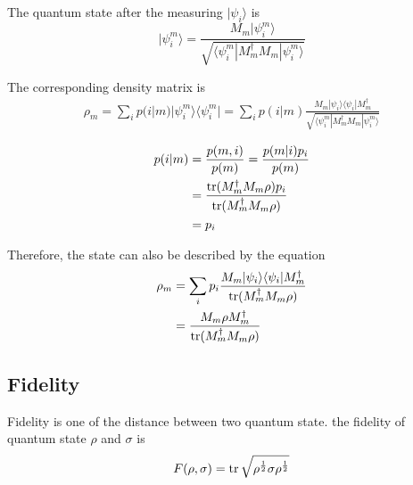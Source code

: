 The quantum state after the measuring $|\psi_i\rangle$ is 
\begin{equation}
  |\psi^m_i\rangle = \frac{M_m|\psi^m_i\rangle}{\sqrt{\langle \psi^m_i|M^{\dagger}_m M_m|\psi^m_i\rangle}}
\end{equation}

The corresponding density matrix is
\begin{equation}
  \begin{split}
    \rho_m = \sum_i p(i|m)|\psi^m_i\rangle\langle\psi^m_i| = \sum_i p(i|m)\frac{M_m|\psi_i\rangle\langle\psi_i|M^{\dagger}_m}{\sqrt{\langle \psi^m_i|M^{\dagger}_m M_m|\psi^m_i\rangle}}
  \end{split}
\end{equation}

\begin{equation}
  \begin{split}
    p(i|m) &= \frac{p(m, i)}{p(m)} = \frac{p(m|i)p_i}{p(m)} \\
    &= \frac{\operatorname{tr}(M^{\dagger}_m M_m \rho) p_i}{\operatorname{tr}(M^{\dagger}_m M_m \rho)} \\
    &= p_i
  \end{split}
\end{equation}

Therefore, the state can also be described by the equation
\begin{equation}
  \begin{split}
    \rho_m &= \sum_i p_i \frac{M_m|\psi_i\rangle\langle\psi_i|M^{\dagger}_m}{\operatorname{tr}(M^{\dagger}_m M_m \rho)} \\
    &= \frac{M_m \rho M^{\dagger}_m}{\operatorname{tr}(M^{\dagger}_m M_m \rho)}
  \end{split}
\end{equation}



 \subsection{Fidelity}

 Fidelity is one of the distance between two quantum state. the fidelity of quantum state $\rho$ and $\sigma$ is
 \begin{equation}
  \begin{split}
    F(\rho, \sigma) &= \operatorname{tr}{\sqrt{\rho^{\frac{1}{2}}\sigma\rho^{\frac{1}{2}}}} \\
  \end{split}
\end{equation}


